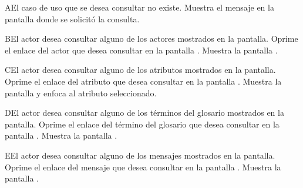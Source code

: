  \begin{UCtrayectoriaA}{A}{El caso de uso que se desea consultar no existe.}
    \UCpaso[\UCsist] Muestra el mensaje  en la pantalla donde se solicitó la consulta.
 \end{UCtrayectoriaA} 
 \begin{UCtrayectoriaA}{B}{El actor desea consultar alguno de los actores mostrados en la pantalla.}
    \UCpaso[\UCactor] Oprime el enlace del actor que desea consultar en la pantalla . \label{cu5.4:consultarActor}
	\UCpaso[\UCsist] Muestra la pantalla .
 \end{UCtrayectoriaA}
 \begin{UCtrayectoriaA}{C}{El actor desea consultar alguno de los atributos mostrados en la pantalla.}
    \UCpaso[\UCactor] Oprime el enlace del atributo que desea consultar en la pantalla . \label{cu5.4:consultarAtributo}
	\UCpaso[\UCsist] Muestra la pantalla  y enfoca al atributo seleccionado.
 \end{UCtrayectoriaA}
 \begin{UCtrayectoriaA}{D}{El actor desea consultar alguno de los términos del glosario mostrados en la pantalla.}
    \UCpaso[\UCactor] Oprime el enlace del término del glosario que desea consultar en la pantalla . \label{cu5.4:consultarTermino}
	\UCpaso[\UCsist] Muestra la pantalla .
 \end{UCtrayectoriaA}
 \begin{UCtrayectoriaA}{E}{El actor desea consultar alguno de los mensajes mostrados en la pantalla.}
    \UCpaso[\UCactor] Oprime el enlace del mensaje que desea consultar en la pantalla . \label{cu5.4:consultarMensaje}
	\UCpaso[\UCsist] Muestra la pantalla .
 \end{UCtrayectoriaA}
